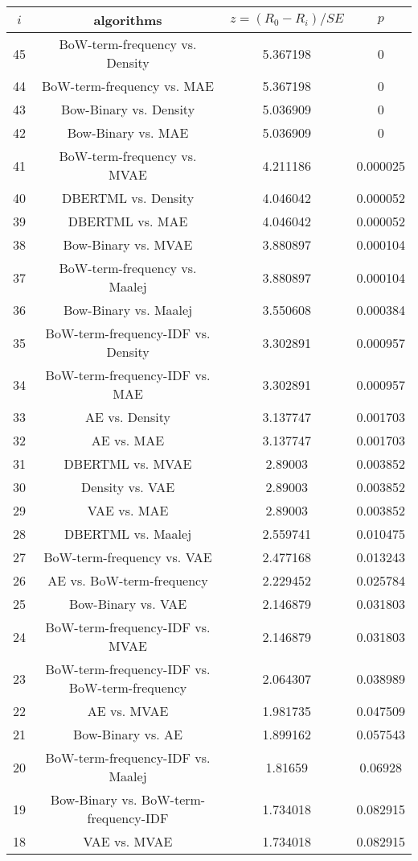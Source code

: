 \documentclass[a4paper,10pt]{article}
\begin{document}
\begin{landscape}
\begin{table}[!htp]
\centering\scriptsize
\begin{tabular}{cccc}
$i$&algorithms&$z=(R_0 - R_i)/SE$&$p$\\
\hline45&BoW-term-frequency vs. Density&5.367198&0\\
44&BoW-term-frequency vs. MAE&5.367198&0\\
43&Bow-Binary vs. Density&5.036909&0\\
42&Bow-Binary vs. MAE&5.036909&0\\
41&BoW-term-frequency vs. MVAE&4.211186&0.000025\\
40&DBERTML vs. Density&4.046042&0.000052\\
39&DBERTML vs. MAE&4.046042&0.000052\\
38&Bow-Binary vs. MVAE&3.880897&0.000104\\
37&BoW-term-frequency vs. Maalej&3.880897&0.000104\\
36&Bow-Binary vs. Maalej&3.550608&0.000384\\
35&BoW-term-frequency-IDF vs. Density&3.302891&0.000957\\
34&BoW-term-frequency-IDF vs. MAE&3.302891&0.000957\\
33&AE vs. Density&3.137747&0.001703\\
32&AE vs. MAE&3.137747&0.001703\\
31&DBERTML vs. MVAE&2.89003&0.003852\\
30&Density vs. VAE&2.89003&0.003852\\
29&VAE vs. MAE&2.89003&0.003852\\
28&DBERTML vs. Maalej&2.559741&0.010475\\
27&BoW-term-frequency vs. VAE&2.477168&0.013243\\
26&AE vs. BoW-term-frequency&2.229452&0.025784\\
25&Bow-Binary vs. VAE&2.146879&0.031803\\
24&BoW-term-frequency-IDF vs. MVAE&2.146879&0.031803\\
23&BoW-term-frequency-IDF vs. BoW-term-frequency&2.064307&0.038989\\
22&AE vs. MVAE&1.981735&0.047509\\
21&Bow-Binary vs. AE&1.899162&0.057543\\
20&BoW-term-frequency-IDF vs. Maalej&1.81659&0.06928\\
19&Bow-Binary vs. BoW-term-frequency-IDF&1.734018&0.082915\\
18&VAE vs. MVAE&1.734018&0.082915\\

\end{tabular}
\end{table}
\end{landscape}
\end{document}
